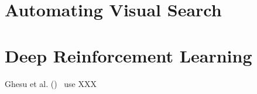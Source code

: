 \section{Automating Visual Search}



\section{Deep Reinforcement Learning}

Ghesu et al. ()~\cite{ghesu_multi-scale_2019} use XXX
